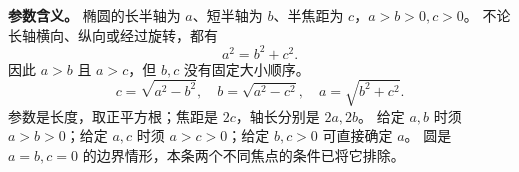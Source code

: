 \begin{statementbox}
\textbf{参数含义。} 椭圆的长半轴为 $a$、短半轴为 $b$、半焦距为 $c$，$a>b>0,c>0$。
不论长轴横向、纵向或经过旋转，都有
\[
\boxed{a^2=b^2+c^2}.
\]
因此 $a>b$ 且 $a>c$，但 $b,c$ 没有固定大小顺序。
\[
c=\sqrt{a^2-b^2},\quad b=\sqrt{a^2-c^2},\quad a=\sqrt{b^2+c^2}.
\]
参数是长度，取正平方根；焦距是 $2c$，轴长分别是 $2a,2b$。
给定 $a,b$ 时须 $a>b>0$；给定 $a,c$ 时须 $a>c>0$；给定 $b,c>0$ 可直接确定 $a$。
圆是 $a=b,c=0$ 的边界情形，本条两个不同焦点的条件已将它排除。
\end{statementbox}
